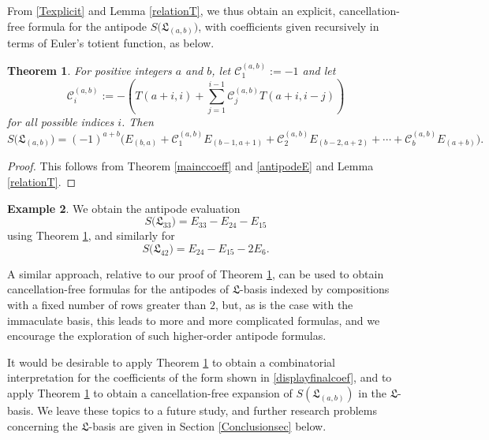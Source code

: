 \documentclass{amsart}
\newtheorem{theorem}{Theorem}[section]
\theoremstyle{definition}
\newtheorem{example}[theorem]{Example}
\newcommand{\lx}{\mathfrak{L}}
\begin{document}
 From \eqref{Texplicit} and Lemma \ref{relationT}, we thus obtain an explicit, cancellation-free formula for the antipode $ S\big(\lx_{(a, 
 b)}\big)$, with coefficients given recursively in terms of Euler's totient function, as below. 

\begin{theorem}\label{mainantipodethm}
 For positive integers $a$ and $b$, let 
 $\mathcal{C}^{(a, b)}_{1} := -1 $ 
 and let 
\begin{equation}\label{displayfinalcoef}
 \mathcal{C}^{(a, b)}_{i} := -\left( 
 T(a+i,i) 
 + \sum_{j=1}^{i-1} \mathcal{C}^{(a, b)}_{j}
 T(a+i,i-j) \right) 
\end{equation} 
 for all possible indices $i$. Then 
\begin{equation*}
 S\big(\lx_{(a, b)}\big) = (-1)^{a+b} \big( E_{(b, a)} + \mathcal{C}_{1}^{(a, b)} E_{(b-1, a + 1)} + \mathcal{C}_{2}^{(a, b)} E_{(b-2, a + 2)}
 + \cdots + \mathcal{C}_{b}^{(a, b)} E_{(a+b)} \big). 
 \end{equation*} 
\end{theorem}

\begin{proof}
 This follows from Theorem \ref{mainccoeff} and \eqref{antipodeE} and Lemma \ref{relationT}. 
\end{proof}

\begin{example}
 We obtain the antipode evaluation $$ S\big( \lx_{33} \big) = E_{33} - E_{24} - E_{15}$$ using Theorem \ref{mainantipodethm}, and similarly 
 for $$ S\big( \lx_{42} \big) = E_{24} - E_{15} - 2 E_{6}. $$
\end{example}

 A similar approach, relative to our proof of Theorem \ref{mainantipodethm}, can be used to obtain cancellation-free formulas for the 
 antipodes of $\lx$-basis indexed by compositions with a fixed number of rows greater than $2$, but, as is the case with the immaculate 
 basis, this leads to more and more complicated formulas, and we encourage the exploration of such higher-order antipode formulas. 
 
 It would be desirable to apply Theorem \ref{mainantipodethm} to obtain a combinatorial interpretation for the coefficients of the form 
 shown in \eqref{displayfinalcoef}, and to apply Theorem \ref{mainantipodethm} to obtain a cancellation-free 
 expansion of $S(\lx_{(a, b)})$ in the $\lx$-basis. We leave these topics to a future study, and further research problems 
 concerning the $\lx$-basis are given in Section \ref{Conclusionsec} below. 
 
\end{document}
